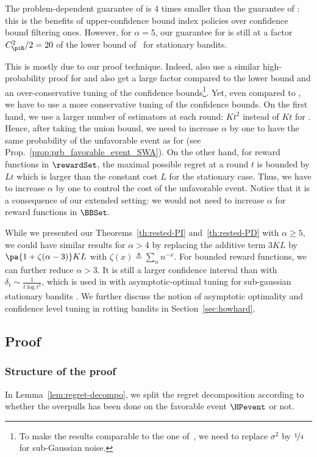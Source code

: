 \begin{remark}
The problem-dependent guarantee of \RUCB is 4 times smaller than the guarantee of \FEWA: this is the benefits of upper-confidence bound index policies over confidence bound filtering ones. However, for $\alpha = 5$, our guarantee for \RUCB is still at a factor $C_{\piR}^2 /2 = 20$ of the lower bound of~\citet{lai1985asymptotically} for stationary bandits.

This is mostly due to our proof technique. Indeed, \citet{auer2002finite} also use a similar high-probability proof for \UCBone and also get a large factor compared to the lower bound and an over-conservative tuning of the confidence bounds\footnote{To make the results comparable to the one of~\citet{auer2002finite}, we need to replace $\sigma^2$ by $\nicefrac{1}{4}$ for sub-Gaussian noise.}. Yet, even compared to \UCBone, we have to use a more conservative tuning of the confidence bounds. On the first hand, we use a larger number of estimators at each round: $Kt^2$ instead of $Kt$ for \UCB. Hence, after taking the union bound, we need to increase $\alpha$ by one to have the same probability of the unfavorable event as for \UCBone (see Prop.~\ref{prop:prb_favorable_event_SWA}). On the other hand, for reward functions in $\rewardSet$, the maximal possible regret at a round $t$ is bounded by $Lt$ which is larger than the constant cost $L$ for the stationary case. Thus, we have to increase $\alpha$ by one to control the cost of the unfavorable event. Notice that it is a consequence of our extended setting: we would not need to increase $\alpha$ for reward functions in $\BBSet$.

While we presented our Theorems~\ref{th:rested-PI} and~\ref{th:rested-PD} with $\alpha \geq 5$, we could have similar results for $\alpha > 4$ by replacing the additive term $3KL$ by $\pa{1 + \zeta(\alpha-3)}KL$ with $\zeta(x) \triangleq \sum_n n^{-x}$. For bounded reward functions, we can further reduce $\alpha >3$. It is still a larger confidence interval than with $\delta_t \sim \frac{1}{t\log{t}^2}$, which is used in \UCB with asymptotic-optimal tuning for sub-gaussian stationary bandits  \citep{lattimore2020banditbook}.  We further discuss the notion of asymptotic optimality and confidence level tuning in rotting bandits in Section~\ref{sec:howhard}. 
\end{remark}
%
\subsection{Proof}
\subsubsection*{Structure of the proof}
In Lemma~\ref{lem:regret-decompo}, we split the regret decomposition according to whether the overpulls has been done on the favorable event $\HPevent$ or not. 

